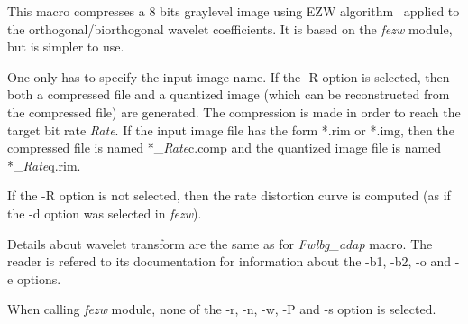 This macro compresses a 8 bits graylevel image using EZW 
algorithm~\cite{shapiro:embedded} applied to the orthogonal/biorthogonal 
wavelet coefficients. 
It is based on the {\em fezw} module, but is simpler to use. 

One only has to specify the input image name. 
If the -R option is selected, then both a compressed file and a quantized 
image (which can be reconstructed from the compressed file) are generated. 
The compression is made in order to reach the target bit rate {\em Rate}. 
If the input image file has the form *.rim or *.img, then 
the compressed file is named *\_{\em Rate}c.comp and the quantized image file 
is named *\_{\em Rate}q.rim.

If the -R option is not selected, then the rate distortion curve is computed 
(as if the -d option was selected in {\em fezw}). 

Details about wavelet transform are the same as for {\em Fwlbg\_adap} macro. 
The reader is refered to its documentation for information about the -b1, -b2, 
-o and -e options. 


When calling {\em fezw} module, none of the -r, -n, -w, -P and -s option is 
selected. 

